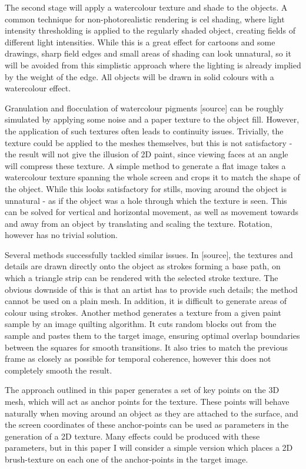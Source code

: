 \documentclass[a4paper, 12pt]{article}
\begin{document}
The second stage will apply a watercolour texture and shade to the objects. A common technique for non-photorealistic rendering is cel shading, where light intensity thresholding is applied to the regularly shaded object, creating fields of different light intensities. While this is a great effect for cartoons and some drawings, sharp field edges and small areas of shading can look unnatural, so it will be avoided from this simplistic approach where the lighting is already implied by the weight of the edge. All objects will be drawn in solid colours with a watercolour effect.

Granulation and flocculation of watercolour pigments [source] can be roughly simulated by applying some noise and a paper texture to the object fill. However, the application of such textures often leads to continuity issues. Trivially, the texture could be applied to the meshes themselves, but this is not satisfactory - the result will not give the illusion of 2D paint, since viewing faces at an angle will compress these texture. A simple method to generate a flat image takes a watercolour texture spanning the whole screen and crops it to match the shape of the object. While this looks satisfactory for stills, moving around the object is unnatural - as if the object was a hole through which the texture is seen. This can be solved for vertical and horizontal movement, as well as movement towards and away from an object by translating and scaling the texture. Rotation, however has no trivial solution.

Several methods successfully tackled similar issues. In [source], the textures and details are drawn directly onto the object as strokes forming a base path, on which a triangle strip can be rendered with the selected stroke texture. The obvious downside of this is that an artist has to provide such details; the method cannot be used on a plain mesh. In addition, it is difficult to generate areas of colour using strokes. Another method generates a texture from a given paint sample by an image quilting algorithm. It cuts random blocks out from the sample and pastes them to the target image, ensuring optimal overlap boundaries between the squares for smooth transitions. It also tries to match the previous frame as closely as possible for temporal coherence, however this does not completely smooth the result.

The approach outlined in this paper generates a set of key points on the 3D mesh, which will act as anchor points for the texture. These points will behave naturally when moving around an object as they are attached to the surface, and the screen coordinates of these anchor-points can be used as parameters in the generation of a 2D texture. Many effects could be produced with these parameters, but in this paper I will consider a simple version which places a 2D brush-texture on each one of the anchor-points in the target image.
\end{document}
